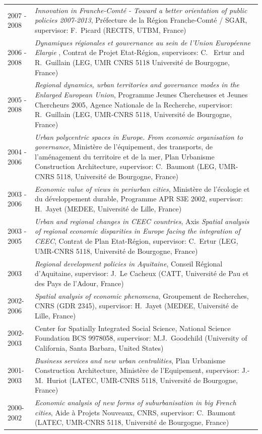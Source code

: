 \documentclass[a4paper,12pt]{article}
\begin{document}
\begin{longtable}{@{}p{\annee}p{\texte}@{}}
2007 - 2008 & \og{}\textit{Innovation in Franche-Comté - Toward a better orientation of public policies 2007-2013}\fg{}, Préfecture de la Région Franche-Comté / SGAR, supervisor: F.~Picard (RECITS, UTBM, France) \\
2006 - 2008 & \og{}\textit{Dynamiques régionales et gouvernance au sein de l'Union Européenne Elargie }\fg{}, Contrat de Projet Etat-Région, supervisors: C.~ Ertur and R.~Guillain (LEG, UMR CNRS 5118 Université de Bourgogne, France) \\
2005 - 2008 & \og{}\textit{Regional dynamics, urban territories and governance modes in the Enlarged European Union}\fg{}, Programme Jeunes Chercheuses et Jeunes Chercheurs 2005, Agence Nationale de la Recherche, supervisor: R.~Guillain (LEG, UMR-CNRS 5118, Université de Bourgogne, France) \\
2004 - 2006 & \og{}\textit{Urban polycentric spaces in Europe. From economic organisation to governance}\fg{}, Ministère de l'équipement, des transports, de l'aménagement du territoire et de la mer, Plan Urbanisme Construction Architecture, supervisor: C.~Baumont (LEG, UMR-CNRS 5118, Université de Bourgogne, France) \\
2003 - 2006 & \og{}\textit{Economic value of views in periurban cities}\fg{}, Ministère de l'écologie et du développement durable, Programme APR S3E 2002, supervisor: H.~Jayet (MEDEE, Université de Lille, France) \\
2003 - 2005	& \og{}\textit{Urban and regional changes in CEEC countries}\fg{}, Axis \og{}\textit{Spatial analysis of regional economic disparities in Europe facing the integration of CEEC}\fg{}, Contrat de Plan Etat-Région, supervisor: C.~Ertur (LEG, UMR-CNRS 5118, Université de Bourgogne, France) \\
2003		& \og{}\textit{Regional development policies in Aquitaine}\fg{}, Conseil Régional d'Aquitaine, supervisor: J.~Le Cacheux (CATT, Université de Pau et des Pays de l'Adour, France) \\
2002-2006	& \og{}\textit{Spatial analysis of economic phenomena}\fg{}, Groupement de Recherches, CNRS (GDR 2345), supervisor: H.~Jayet (MEDEE, Université de Lille, France) \\
2002-2003	& Center for Spatially Integrated Social Science, National Science Foundation BCS 9978058, supervisor: M.J.~Goodchild (University of California, Santa Barbara, United States) \\
2001-2003 	& \og{}\textit{Business services and new urban centralities}\fg{}, Plan Urbanisme Construction Architecture, Ministère de l'Equipement, supervisor: J.-M.~Huriot (LATEC, UMR-CNRS 5118, Université de Bourgogne, France) \\
2000-2002 	& \og{}\textit{Economic analysis of new forms of suburbanisation in big French cities}\fg{}, Aide à Projets Nouveaux, CNRS, supervisor: C.~Baumont (LATEC, UMR-CNRS 5118, Université de Bourgogne, France) \\
\end{longtable}
\end{document}
